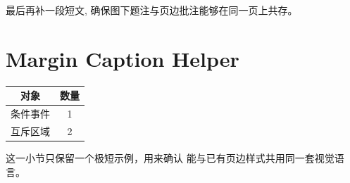 \documentclass[a4paper,12pt,oneside]{maki-notes}
\begin{document}

最后再补一段短文, 确保图下题注与页边批注能够在同一页上共存。

\section{Margin Caption Helper}

\begin{center}
\begin{tabular}{cc}
\toprule
对象 & 数量 \\
\midrule
条件事件 & 1 \\
互斥区域 & 2 \\
\bottomrule
\end{tabular}
\end{center}


这一小节只保留一个极短示例，用来确认 \texttt{\string\sidecaptionof} 能与已有页边样式共用同一套视觉语言。
\end{document}
